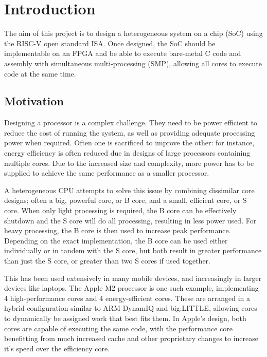 \chapter{Introduction}
\label{ch:introduction}

The aim of this project is to design a heterogeneous system on a chip (SoC) using the RISC-V open standard ISA\cite{riscv-1}\cite{riscv-2}. Once designed, the SoC should be implementable on an FPGA and be able to execute bare-metal C code and assembly with simultaneous multi-processing (SMP), allowing all cores to execute code at the same time.

\section{Motivation}
Designing a processor is a complex challenge. They need to be power efficient to reduce the cost of running the system, as well as providing adequate processing power when required. Often one is sacrificed to improve the other: for instance, energy efficiency is often reduced due in designs of large processors containing multiple cores. Due to the increased size and complexity, more power has to be supplied to achieve the same performance as a smaller processor.

A heterogeneous CPU attempts to solve this issue by combining dissimilar core designs; often a big, powerful core, or B core, and a small, efficient core, or S core. When only light processing is required, the B core can be effectively shutdown and the S core will do all processing, resulting in less power used. For heavy processing, the B core is then used to increase peak performance. Depending on the exact implementation, the B core can be used either individually or in tandem with the S core, but both result in greater performance than just the S core, or greater than two S cores if used together.

This has been used extensively in many mobile devices, and increasingly in larger devices like laptops. The Apple M2 processor\cite{applem2} is one such example, implementing 4 high-performance cores and 4 energy-efficient cores. These are arranged in a hybrid configuration similar to ARM DynamIQ and big.LITTLE\cite{biglittle}, allowing cores to dynamically be assigned work that best fits them. In Apple's design, both cores are capable of executing the same code, with the performance core benefitting from much increased cache and other proprietary changes to increase it's speed over the efficiency core. 

